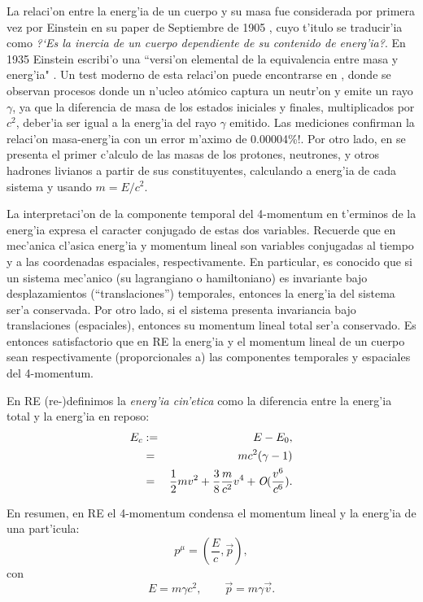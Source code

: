 La relaci'on entre la energ'ia de un cuerpo y su masa fue considerada por primera vez por Einstein en su paper de Septiembre de 1905 \cite{Einstein05}, cuyo t'itulo se traducir'ia como \textit{?`Es la inercia de un cuerpo dependiente de su contenido de energ'ia?}. En 1935 Einstein escribi'o una ``versi'on elemental de la equivalencia entre masa y energ'ia" \cite{Einstein35}. Un test moderno de esta relaci'on puede encontrarse en \cite{Rainville05}, donde se observan procesos donde un n'ucleo atómico captura un neutr'on y emite un rayo $\gamma$, ya que la diferencia de masa de los estados iniciales y finales, multiplicados por $c^2$, deber'ia ser igual a la energ'ia del rayo $\gamma$ emitido. Las mediciones confirman la relaci'on masa-energ'ia con un error m'aximo de 0.00004\%!. Por otro lado, en \cite{Duerr08} se presenta el primer c'alculo de las masas de los protones, neutrones, y otros hadrones livianos a partir de sus constituyentes, calculando a energ'ia de cada sistema y usando $m=E/c^2$.

La interpretaci'on de la componente temporal del 4-momentum en t'erminos de la energ'ia expresa el caracter conjugado de estas dos variables. Recuerde que en mec'anica cl'asica energ'ia y momentum lineal son variables conjugadas al tiempo y a las coordenadas espaciales, respectivamente. En particular, es conocido que si un sistema mec'anico (su lagrangiano o hamiltoniano) es invariante bajo desplazamientos (``translaciones'') temporales, entonces la energ'ia del sistema ser'a conservada. Por otro lado, si el sistema presenta invariancia bajo translaciones (espaciales), entonces su momentum lineal total ser'a conservado. Es entonces satisfactorio que en RE la energ'ia y el momentum lineal de un cuerpo sean respectivamente (proporcionales a) las componentes temporales y espaciales del 4-momentum.

En RE (re-)definimos la \textit{energ'ia cin'etica} como la diferencia entre la
energ'ia total y la energ'ia en reposo:
\begin{eqnarray}
E_{c}&:=&E-E_0,\\
&=&mc^2(\gamma-1)\\
&=&\frac{1}{2}mv^2+\frac{3}{8}\frac{m}{c^2}v^4+\emph{O}(\frac{v^{6}}{c^{6}}).
\end{eqnarray}

En resumen, en RE el 4-momentum condensa el momentum lineal y la energ'ia de una
part'icula:
\begin{equation}
\boxed{p^\mu=(\frac{E}{c},\vec{p}) ,\label{pep}}
\end{equation}
con
\begin{equation}
\boxed{E=m\gamma c^2, \qquad \vec{p}=m\gamma \vec{v}.}
\end{equation}


